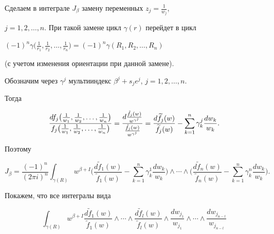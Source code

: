 \begin{pf}


Сделаем в интеграле $J_\beta$ замену переменных $z_j=\frac 1{w_j}$,


$j=1,2,\dotsc,n$. При такой замене цикл $\gamma(r)$ перейдет в цикл 


$(-1)^n\gamma\big(\frac1{r_1},\frac 1{r_2},\dotsc, \frac 1{r_n}\big)


=(-1)^n\gamma(R_1,R_2,\dotsc,R_n)$


(с учетом изменения ориентации при данной замене).





Обозначим через $\gamma^j$ мультииндекс $\beta^j+s_je^j$, $j=1,2,\dotsc,n$.


Тогда


$$


\frac{df_j\big(\frac 1{w_1},\frac 1{w_2},\dotsc,\frac 1{w_n}\big)}{


f_j\big(\frac 1{w_1},\frac 1{w_2},\dotsc,\frac 1{w_n}\big)}=


\frac{d\frac{\Tilde f_j(w)}{w^{\gamma^j}}}{


\frac{\Tilde f_j(w)}{w^{\gamma^j}}}=\frac{d \widetilde f_j(w)}{


\widetilde f_j(w) }-\sum_{k=1}^n\gamma^j_k\frac{dw_k}{w_k}.


$$


Поэтому


$$


J_\beta=\frac{(-1)^n}{(2\pi i)^n}\int_{\gamma(R)}w^{\beta+I}\bigg(


\frac{d \widetilde f_1(w)}{\widetilde f_1(w) }-\sum_{k=1}^n\gamma^1_k


\frac{dw_k}{w_k}\bigg)\land\dotsb\land\bigg(


\frac{d \widetilde f_n(w)}{\widetilde f_n(w) }-\sum_{k=1}^n\gamma^n_k


\frac{dw_k}{w_k}\bigg).


$$


Покажем, что все интегралы вида


\begin{equation}\label{f9}


\int_{\gamma(R)}w^{\beta+I} \frac{d \widetilde f_1(w)}{\widetilde f_1(w) }


\land\dotsb\land\frac{d \widetilde f_l(w)}{\widetilde f_l(w) }\land


\frac{dw_{j_1}}{w_{j_1}}\land\dotsb\land \frac{dw_{j_{n-l}}}{w_{j_{n-l}}}


\end{equation}



\end{pf}
